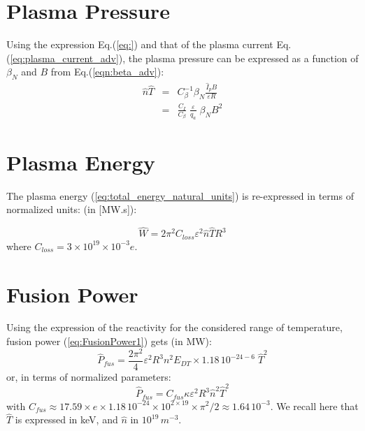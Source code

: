 \section{Plasma Pressure}
Using the expression Eq.(\ref{eq:}) and that of the plasma current Eq.(\ref{eq:plasma_current_adv}), the plasma pressure can be expressed as a function of $\beta_N$ and $B$ from Eq.(\ref{eqn:beta_adv}):
\begin{eqnarray}
\hat n\hat T &=& C_\beta^{-1} \beta_N \frac{\hat I_p B}{\varepsilon R} \nonumber \\
&=& \frac{C_I}{C_\beta}\; \frac{\varepsilon}{q_a} \;  \beta_N B^2
\label{eqn:nT_betaN_adv}
\end{eqnarray}

\section{Plasma Energy}
The plasma energy (\ref{eq:total_energy_natural_units}) is re-expressed in terms of normalized units: (in [MW.s]):

\begin{equation}
\hat W = 2\pi^2 C_{loss}  \varepsilon^2  \hat n \hat T R^3
\label{eq:total_energy}
\end{equation}
where $C_{loss} = 3 \times 10^{19} \times 10^{-3} e$.



\section{Fusion Power}
Using the expression of the reactivity for the considered range of temperature, fusion power (\ref{eq:FusionPower1}) gets (in MW):
\begin{equation}
\hat P_{fus} 
=
\frac{2\pi^2}{4}
\varepsilon^2 R^3
n^2 E_{DT}
\times
1.18\, 10^{-24-6}\; \hat T^2 
\end{equation}
or, in terms of normalized parameters:
\begin{equation}
\boxed{
	\hat P_{fus} 
	=
	C_{fus} \kappa \varepsilon^2 R^3 \hat n^2 \hat T^2
}
\label{eq:DT_fusion_power_adv}
\end{equation}
with $C_{fus} \approx 17.59 \times e\times 1.18\, 10^{-24} \times 10^{2\times19}\times \pi^2/2 \approx 1.64\, 10^{-3}$. We recall here that $\hat T$ is expressed in keV, and $\hat n$ in $10^{19} \, \si{m^{-3}}$. 



